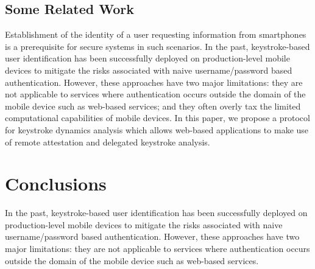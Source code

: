 \documentclass[twocolumn]{article}
\begin{document}
\subsection{Some Related Work} 
Establishment of the identity of a user requesting information from smartphones is a prerequisite for  secure systems in such scenarios. In the past, keystroke-based user identification has been successfully deployed on production-level mobile devices to mitigate the risks associated with naive username/password based authentication. However, these approaches have two major limitations: they are not applicable to services where authentication occurs outside the domain of the mobile
device such as web-based services; and they often overly tax the limited computational capabilities of mobile devices. In this paper, we propose a protocol for keystroke dynamics analysis which allows web-based applications to make use of remote attestation and delegated keystroke analysis.

\section{Conclusions}
In the past, keystroke-based user identification has been successfully deployed on production-level mobile devices to mitigate the risks associated with naive username/password based authentication. However, these approaches have two major limitations: they are not applicable to services where authentication occurs outside the domain of the mobile
device such as web-based services.





   
\end{document}
